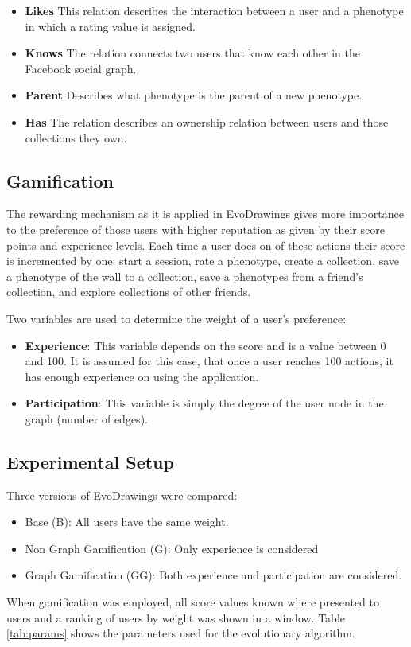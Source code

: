\begin{itemize}
\item {\bf Likes} This relation describes the interaction between a user and
a phenotype in which a rating value is assigned.

\item {\bf Knows} The relation connects two users that know each
other in the Facebook social graph. 

\item {\bf Parent} Describes what phenotype is the parent of a new
  phenotype. 

\item {\bf Has} The relation describes an ownership relation between users and
those collections they own. 
\end{itemize}

\subsection{Gamification}
The rewarding mechanism as it is applied in EvoDrawings gives more importance 
to the preference of those users with higher reputation
as given by their score points and experience levels.  
Each time a user does on of these actions their score is incremented by one:
start a session, rate a phenotype, create a collection, save a phenotype of 
the wall to a collection, save a phenotypes from a friend's collection, and
explore collections of other friends.

Two variables are used to determine the weight of a user's preference:
\begin{itemize}
\item {\bf Experience}: This variable depends on the score and is a value 
between 0 and 100. It is assumed for this case, that once a user
reaches 100 actions, it has enough experience on using the
application. %

\item {\bf Participation}: This variable is simply the degree of the user node 
in the graph (number of edges).    
\end{itemize}

\subsection{Experimental Setup}

Three versions of EvoDrawings were compared:
\begin{itemize}
\item Base (B): All users have the same weight.
\item Non Graph Gamification (G): Only experience is considered
\item Graph Gamification (GG): Both experience and participation are considered.
\end{itemize}
When gamification was employed, all score values known where presented to users
and a ranking of users by weight was shown in a window. Table \ref{tab:params} shows 
the parameters used for the evolutionary algorithm. 

